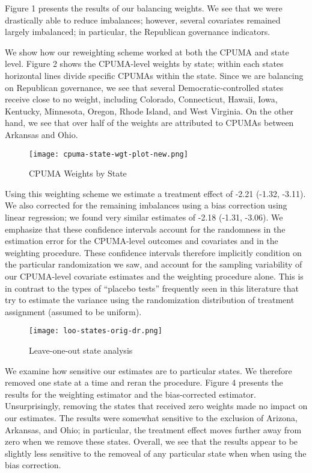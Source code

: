 \documentclass[final]{article}
\begin{document}
Figure 1 presents the results of our balancing weights. We see that we were drastically able to reduce imbalances; however, several covariates remained largely imbalanced; in particular, the Republican governance indicators.

We show how our reweighting scheme worked at both the CPUMA and state level. Figure 2 shows the CPUMA-level weights by state; within each states horizontal lines divide specific CPUMAs within the state. Since we are balancing on Republican governance, we see that several Democratic-controlled states receive close to no weight, including Colorado, Connecticut, Hawaii, Iowa, Kentucky, Minnesota, Oregon, Rhode Island, and West Virginia. On the other hand, we see that over half of the weights are attributed to CPUMAs between Arkansas and Ohio.

\begin{figure}
    \texttt{[image: cpuma-state-wgt-plot-new.png]}
    \caption{CPUMA Weights by State}
\end{figure}

Using this weighting scheme we estimate a treatment effect of -2.21 (-1.32, -3.11). We also corrected for the remaining imbalances using a bias correction using linear regression; we found very similar estimates of -2.18 (-1.31, -3.06). We emphasize that these confidence intervals account for the randomness in the estimation error for the CPUMA-level outcomes and covariates and in the weighting procedure. These confidence intervals therefore implicitly condition on the particular randomization we saw, and account for the sampling variability of our CPUMA-level covariate estimates and the weighting procedure alone. This is in contrast to the types of ``placebo tests'' frequently seen in this literature that try to estimate the variance using the randomization distribution of treatment assignment (assumed to be uniform).

\begin{figure}
    \texttt{[image: loo-states-orig-dr.png]}
    \caption{Leave-one-out state analysis}
\end{figure}

We examine how sensitive our estimates are to particular states. We therefore removed one state at a time and reran the procedure. Figure 4 presents the results for the weighting estimator and the bias-corrected estimator. Unsurprisingly, removing the states that received zero weights made no impact on our estimates. The results were somewhat sensitive to the exclusion of Arizona, Arkansas, and Ohio; in particular, the treatment effect moves further away from zero when we remove these states. Overall, we see that the results appear to be slightly less sensitive to the removeal of any particular state when when using the bias correction.
\end{document}
